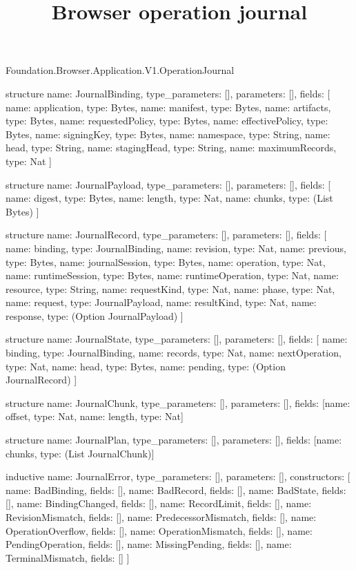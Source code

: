 \begin{lexlean}{Foundation.Browser.Application.V1.OperationJournal}
\title{Browser operation journal}
\begin{semanticmodule}
structure{
  name: JournalBinding,
  type_parameters: [],
  parameters: [],
  fields: [
    {name: application, type: Bytes},
    {name: manifest, type: Bytes},
    {name: artifacts, type: Bytes},
    {name: requestedPolicy, type: Bytes},
    {name: effectivePolicy, type: Bytes},
    {name: signingKey, type: Bytes},
    {name: namespace, type: String},
    {name: head, type: String},
    {name: stagingHead, type: String},
    {name: maximumRecords, type: Nat}
  ]
}

structure{
  name: JournalPayload,
  type_parameters: [],
  parameters: [],
  fields: [
    {name: digest, type: Bytes},
    {name: length, type: Nat},
    {name: chunks, type: (List Bytes)}
  ]
}

structure{
  name: JournalRecord,
  type_parameters: [],
  parameters: [],
  fields: [
    {name: binding, type: JournalBinding},
    {name: revision, type: Nat},
    {name: previous, type: Bytes},
    {name: journalSession, type: Bytes},
    {name: operation, type: Nat},
    {name: runtimeSession, type: Bytes},
    {name: runtimeOperation, type: Nat},
    {name: resource, type: String},
    {name: requestKind, type: Nat},
    {name: phase, type: Nat},
    {name: request, type: JournalPayload},
    {name: resultKind, type: Nat},
    {name: response, type: (Option JournalPayload)}
  ]
}

structure{
  name: JournalState,
  type_parameters: [],
  parameters: [],
  fields: [
    {name: binding, type: JournalBinding},
    {name: records, type: Nat},
    {name: nextOperation, type: Nat},
    {name: head, type: Bytes},
    {name: pending, type: (Option JournalRecord)}
  ]
}

structure{
  name: JournalChunk,
  type_parameters: [],
  parameters: [],
  fields: [{name: offset, type: Nat}, {name: length, type: Nat}]
}

structure{
  name: JournalPlan,
  type_parameters: [],
  parameters: [],
  fields: [{name: chunks, type: (List JournalChunk)}]
}

inductive{
  name: JournalError,
  type_parameters: [],
  parameters: [],
  constructors: [
    {name: BadBinding, fields: []},
    {name: BadRecord, fields: []},
    {name: BadState, fields: []},
    {name: BindingChanged, fields: []},
    {name: RecordLimit, fields: []},
    {name: RevisionMismatch, fields: []},
    {name: PredecessorMismatch, fields: []},
    {name: OperationOverflow, fields: []},
    {name: OperationMismatch, fields: []},
    {name: PendingOperation, fields: []},
    {name: MissingPending, fields: []},
    {name: TerminalMismatch, fields: []}
  ]
}


\end{semanticmodule}
\end{lexlean}
